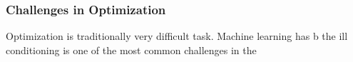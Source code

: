 \subsubsection{Challenges in Optimization}

Optimization is traditionally very difficult task. Machine learning has b
the ill conditioning is one of the most common challenges in the 